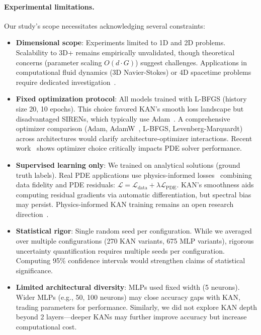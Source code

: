 \documentclass[11pt,a4paper]{article}
\begin{document}
\paragraph{Experimental limitations.} Our study's scope necessitates acknowledging several constraints:
\begin{itemize}
    \item \textbf{Dimensional scope}: Experiments limited to 1D and 2D problems. Scalability to 3D+ remains empirically unvalidated, though theoretical concerns (parameter scaling $O(d \cdot G)$) suggest challenges. Applications in computational fluid dynamics (3D Navier-Stokes) or 4D spacetime problems require dedicated investigation~\citep{raissi2019physics}.
    \item \textbf{Fixed optimization protocol}: All models trained with L-BFGS (history size 20, 10 epochs). This choice favored KAN's smooth loss landscape but disadvantaged SIRENs, which typically use Adam~\citep{sitzmann2020implicit}. A comprehensive optimizer comparison (Adam, AdamW~\citep{loshchilov2019decoupled}, L-BFGS, Levenberg-Marquardt) across architectures would clarify architecture-optimizer interactions. Recent work~\citep{krishnapriyan2021characterizing} shows optimizer choice critically impacts PDE solver performance.
    \item \textbf{Supervised learning only}: We trained on analytical solutions (ground truth labels). Real PDE applications use physics-informed losses~\citep{raissi2019physics} combining data fidelity and PDE residuals: $\mathcal{L} = \mathcal{L}_{\text{data}} + \lambda \mathcal{L}_{\text{PDE}}$. KAN's smoothness aids computing residual gradients via automatic differentiation, but spectral bias may persist. Physics-informed KAN training remains an open research direction~\citep{liu2024kan}.
    \item \textbf{Statistical rigor}: Single random seed per configuration. While we averaged over multiple configurations (270 KAN variants, 675 MLP variants), rigorous uncertainty quantification requires multiple seeds per configuration. Computing 95\% confidence intervals would strengthen claims of statistical significance.
    \item \textbf{Limited architectural diversity}: MLPs used fixed width (5 neurons). Wider MLPs (e.g., 50, 100 neurons) may close accuracy gaps with KAN, trading parameters for performance. Similarly, we did not explore KAN depth beyond 2 layers—deeper KANs may further improve accuracy but increase computational cost.
\end{itemize}
\end{document}
